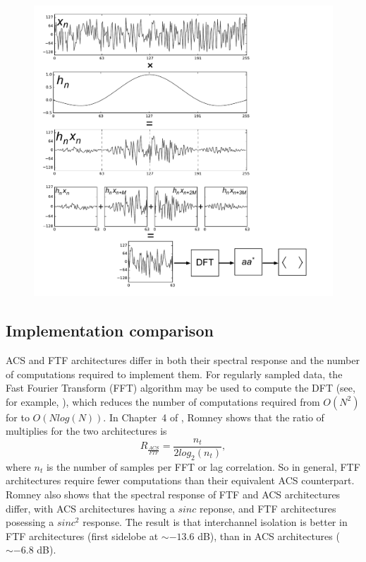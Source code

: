 \documentclass{ws-rv961x669}
\begin{document}
\begin{figure}
 \centering
 \includegraphics[width=\textwidth]{./figures/pfb_chart}
 \label{fig:pfb_chart}
 \caption{}
\end{figure}

\subsection{Implementation comparison}

ACS and FTF architectures differ in both their spectral response and the number of computations required to implement them. For regularly
sampled data, the Fast Fourier Transform (FFT) algorithm may be used to compute the DFT (see, for example, \citep{BookBrighamFFT}),
which reduces the number of computations required from $O(N^{2})$ for to $O(Nlog(N))$. In Chapter~4 of \citep{Taylor1999}, Romney
shows that the ratio of multiplies for the two architectures is 
\begin{equation}
R_{\frac{ACS}{FTF}}=\frac{n_{t}}{\mbox{2}log_{2}(n_{t})},
\end{equation}
where $n_{t}$ is the number of samples per FFT or lag correlation. So in general, FTF architectures require fewer computations than their equivalent ACS counterpart. Romney also shows that the spectral response of FTF and ACS architectures differ, with ACS architectures having a $sinc$ reponse, and FTF architectures posessing a $sinc^{2}$ response. The result is that interchannel isolation is better in FTF architectures (first sidelobe at $\sim-\mbox{13.6}$ dB), than in ACS architectures ($\sim-\mbox{6.8}$ dB). 
\end{document}
